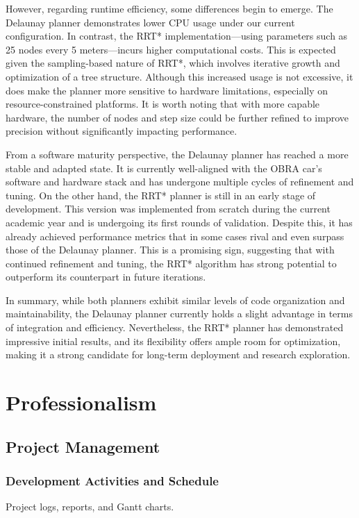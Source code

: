 \documentclass[a4paper,11pt]{report}
\begin{document}
However, regarding runtime efficiency, some differences begin to emerge. The Delaunay planner demonstrates lower CPU usage under our current configuration. In contrast, the RRT* implementation—using parameters such as 25 nodes every 5 meters—incurs higher computational costs. This is expected given the sampling-based nature of RRT*, which involves iterative growth and optimization of a tree structure. Although this increased usage is not excessive, it does make the planner more sensitive to hardware limitations, especially on resource-constrained platforms. It is worth noting that with more capable hardware, the number of nodes and step size could be further refined to improve precision without significantly impacting performance.

From a software maturity perspective, the Delaunay planner has reached a more stable and adapted state. It is currently well-aligned with the OBRA car’s software and hardware stack and has undergone multiple cycles of refinement and tuning. On the other hand, the RRT* planner is still in an early stage of development. This version was implemented from scratch during the current academic year and is undergoing its first rounds of validation. Despite this, it has already achieved performance metrics that in some cases rival and even surpass those of the Delaunay planner. This is a promising sign, suggesting that with continued refinement and tuning, the RRT* algorithm has strong potential to outperform its counterpart in future iterations.

In summary, while both planners exhibit similar levels of code organization and maintainability, the Delaunay planner currently holds a slight advantage in terms of integration and efficiency. Nevertheless, the RRT* planner has demonstrated impressive initial results, and its flexibility offers ample room for optimization, making it a strong candidate for long-term deployment and research exploration.



\newpage

\chapter{Professionalism}
\section{Project Management}
\subsection{Development Activities and Schedule}
Project logs, reports, and Gantt charts.
\end{document}
